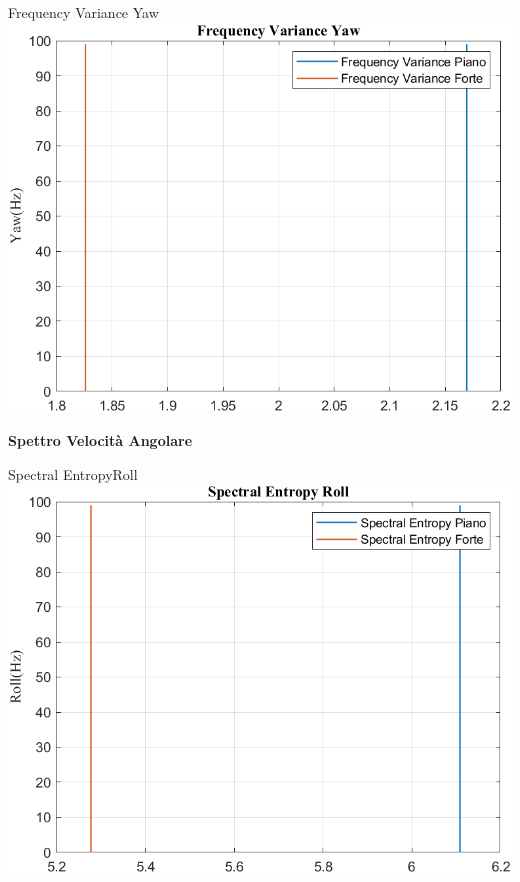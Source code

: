 	\begin{frame}{{Frequency Variance Yaw}}
		\centering\includegraphics[height=.8\textheight]{figure/VAng/Trasformata/Frequency VarianceYaw}
	\end{frame}
	
	\begin{frame}
		\color{blue}\centering\huge{\textbf{Spettro Velocità Angolare}}
	\end{frame}
	
	\begin{frame}{{Spectral EntropyRoll}}
		\centering\includegraphics[height=.8\textheight]{figure/VAng/Trasformata/Spectral EntropyRoll}
	\end{frame}
	
